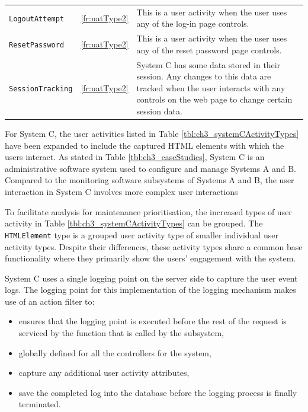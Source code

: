 \begin{table}[!htb]
\begin{tabularx}{\textwidth}{llX}
		\rowcolor{lightgray}
		\texttt{LogoutAttempt} & \ref{fr:uatType2} & \RaggedRight This is a user activity when the user uses any of the log-in page controls. \\
		\texttt{ResetPassword} & \ref{fr:uatType2} & \RaggedRight This is a user activity when the user uses any of the reset password page controls. \\
		\rowcolor{lightgray}
		\texttt{SessionTracking} & \ref{fr:uatType2} & \RaggedRight System C has some data stored in their session. Any changes to this data are tracked when the user interacts with any controls on the web page to change certain session data. \\
		\bottomrule
	\end{tabularx}
\end{table}

For System C, the user activities listed in Table \ref{tbl:ch3_systemCActivityTypes} have been expanded to include the captured HTML elements with which the users interact. As stated in Table \ref{tbl:ch3_caseStudies}, System C is an administrative software system used to configure and manage Systems A and B. Compared to the monitoring software subsystems of Systems A and B, the user interaction in System C involves more complex user interactions\par To facilitate analysis for maintenance prioritisation, the increased types of user activity in Table \ref{tbl:ch3_systemCActivityTypes} can be grouped. The \texttt{HTMLElement} type is a grouped user activity type of smaller individual user activity types. Despite their differences, these activity types share a common base functionality where they primarily show the users' engagement with the system.\par System C uses a single logging point on the server side to capture the user event logs. The logging point for this implementation of the logging mechanism makes use of an action filter to:

\begin{itemize}
	\item ensures that the logging point is executed before the rest of the request is serviced by the function that is called by the subsystem,
	\item globally defined for all the controllers for the system,
	\item capture any additional user activity attributes,
	\item save the completed log into the database before the logging process is finally terminated.
\end{itemize}

